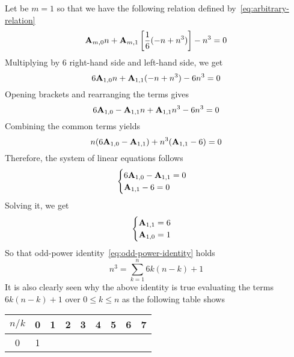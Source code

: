 \begin{examp}
    Let be $m=1$ so that we have the following relation defined by~\eqref{eq:arbitrary-relation}
    \begin{equation*}
        {\mathbf{A}} \sb{m,0} n + {\mathbf{A}} \sb{m,1} \left[ \frac{1}{6} (-n + n^3) \right] -n^3 = 0
    \end{equation*}
    Multiplying by $6$ right-hand side and left-hand side, we get
    \begin{equation*}
        6{\mathbf{A}} \sb{1,0} n + {\mathbf{A}} \sb{1,1} (-n + n^3) - 6n^3 = 0
    \end{equation*}
    Opening brackets and rearranging the terms gives
    \begin{equation*}
        6 {\mathbf{A}} \sb{1,0} - {\mathbf{A}} \sb{1,1} n + {\mathbf{A}} \sb{1,1} n^3 - 6n^3 = 0
    \end{equation*}
    Combining the common terms yields
    \begin{equation*}
        n(6{\mathbf{A}} \sb{1,0} - {\mathbf{A}} \sb{1,1}) + n^3 ({\mathbf{A}} \sb{1,1} - 6) = 0
    \end{equation*}
    Therefore, the system of linear equations follows
    \begin{equation*}
        \begin{cases}
            6 {\mathbf{A}} \sb{1,0} - {\mathbf{A}} \sb{1,1} = 0 \\
            {\mathbf{A}} \sb{1,1} - 6 = 0
        \end{cases}
    \end{equation*}
    Solving it, we get
    \begin{equation*}
        \begin{cases}
            {\mathbf{A}} \sb{1,1} = 6 \\
            {\mathbf{A}} \sb{1,0} = 1
        \end{cases}
    \end{equation*}
    So that odd-power identity~\eqref{eq:odd-power-identity} holds
    \begin{equation*}
        n^3 = \sum_{k=1}^{n} 6k(n-k) + 1
    \end{equation*}
    It is also clearly seen why the above identity is true evaluating the terms $6k(n-k) + 1$ over $0 \leq k \leq n$ as
    the following table shows
    \begin{table}[H]
        \setlength\extrarowheight{-6pt}
        \begin{tabular}{c|cccccccc}
            $n/k$ & 0 & 1  & 2  & 3  & 4  & 5  & 6  & 7 \\
            \hline
            0     & 1 &    &    &    &    &    &    &   \\

\end{tabular}
\end{table}
\end{examp}
